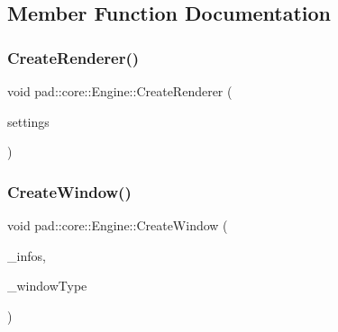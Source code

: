 \subsection{Member Function Documentation}
\mbox{\label{classpad_1_1core_1_1_engine_a093e75eca0488cd579e55e4e258d8266}} 
\subsubsection{\texorpdfstring{Create\+Renderer()}{CreateRenderer()}}
{\footnotesize\ttfamily void pad\+::core\+::\+Engine\+::\+Create\+Renderer (\begin{DoxyParamCaption}\item[{const \mbox{\hyperlink{structpad_1_1gfx_1_1_render_settings}{gfx\+::\+Render\+Settings}} \&}]{settings }\end{DoxyParamCaption})\hspace{0.3cm}{\ttfamily [private]}}

\mbox{\label{classpad_1_1core_1_1_engine_a502a6d0e29f045da8b04020947ed8722}} 
\subsubsection{\texorpdfstring{Create\+Window()}{CreateWindow()}}
{\footnotesize\ttfamily void pad\+::core\+::\+Engine\+::\+Create\+Window (\begin{DoxyParamCaption}\item[{const \mbox{\hyperlink{structpad_1_1sys_1_1_window_settings}{sys\+::\+Window\+Settings}} \&}]{\+\_\+infos,  }\item[{const \mbox{\hyperlink{namespacepad_1_1sys_a33417a3109944d4ec323bc85137e4ea4}{sys\+::\+E\+\_\+\+W\+I\+N\+D\+O\+W\+\_\+\+T\+Y\+PE}}}]{\+\_\+window\+Type }\end{DoxyParamCaption})\hspace{0.3cm}{\ttfamily [private]}}

\mbox{\label{classpad_1_1core_1_1_engine_ae2b0a14fcc29187791d656214846fcd6}} 
